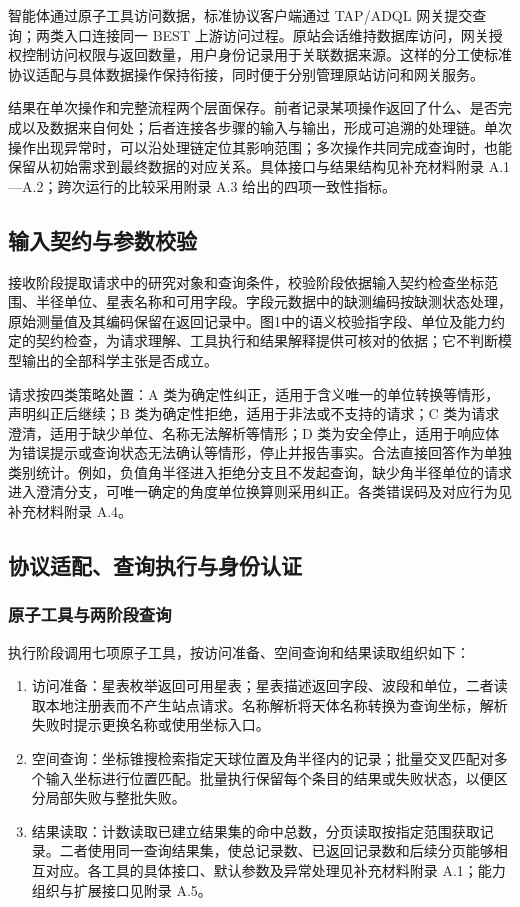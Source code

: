 \documentclass{dcfp}
\begin{document}
\begin{PaperBody}
智能体通过原子工具访问数据，标准协议客户端通过 TAP/ADQL 网关提交查询；两类入口连接同一 BEST 上游访问过程。原站会话维持数据库访问，网关授权控制访问权限与返回数量，用户身份记录用于关联数据来源。这样的分工使标准协议适配与具体数据操作保持衔接，同时便于分别管理原站访问和网关服务。

结果在单次操作和完整流程两个层面保存。前者记录某项操作返回了什么、是否完成以及数据来自何处；后者连接各步骤的输入与输出，形成可追溯的处理链。单次操作出现异常时，可以沿处理链定位其影响范围；多次操作共同完成查询时，也能保留从初始需求到最终数据的对应关系。具体接口与结果结构见补充材料附录 A.1—A.2；跨次运行的比较采用附录 A.3 给出的四项一致性指标。

\subsection{输入契约与参数校验}

接收阶段提取请求中的研究对象和查询条件，校验阶段依据输入契约检查坐标范围、半径单位、星表名称和可用字段。字段元数据中的缺测编码按缺测状态处理，原始测量值及其编码保留在返回记录中。图1中的语义校验指字段、单位及能力约定的契约检查，为请求理解、工具执行和结果解释提供可核对的依据；它不判断模型输出的全部科学主张是否成立。

请求按四类策略处置：A 类为确定性纠正，适用于含义唯一的单位转换等情形，声明纠正后继续；B 类为确定性拒绝，适用于非法或不支持的请求；C 类为请求澄清，适用于缺少单位、名称无法解析等情形；D 类为安全停止，适用于响应体为错误提示或查询状态无法确认等情形，停止并报告事实。合法直接回答作为单独类别统计。例如，负值角半径进入拒绝分支且不发起查询，缺少角半径单位的请求进入澄清分支，可唯一确定的角度单位换算则采用纠正。各类错误码及对应行为见补充材料附录 A.4。

\subsection{协议适配、查询执行与身份认证}

\subsubsection{原子工具与两阶段查询}

执行阶段调用七项原子工具，按访问准备、空间查询和结果读取组织如下：

\begin{enumerate}
\item 访问准备：星表枚举返回可用星表；星表描述返回字段、波段和单位，二者读取本地注册表而不产生站点请求。名称解析将天体名称转换为查询坐标，解析失败时提示更换名称或使用坐标入口。
\item 空间查询：坐标锥搜检索指定天球位置及角半径内的记录；批量交叉匹配对多个输入坐标进行位置匹配。批量执行保留每个条目的结果或失败状态，以便区分局部失败与整批失败。
\item 结果读取：计数读取已建立结果集的命中总数，分页读取按指定范围获取记录。二者使用同一查询结果集，使总记录数、已返回记录数和后续分页能够相互对应。各工具的具体接口、默认参数及异常处理见补充材料附录 A.1；能力组织与扩展接口见附录 A.5。
\end{enumerate}


\end{PaperBody}
\end{document}
